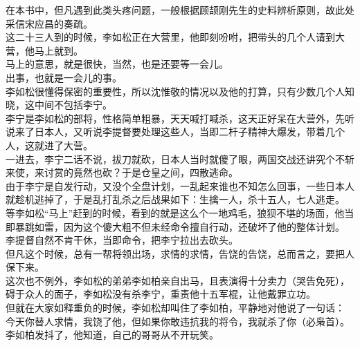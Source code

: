 \begin{multicols}{\theparacolNo}
在本书中，但凡遇到此类头疼问题，一般根据顾颉刚先生的史料辨析原则，故此处采信宋应昌的奏疏。\\

这二十三人到的时候，李如松正在大营里，他即刻吩咐，把带头的几个人请到大营，他马上就到。\\

马上的意思，就是很快，当然，也是还要等一会儿。\\

出事，也就是一会儿的事。\\

李如松很懂得保密的重要性，所以沈惟敬的情况以及他的打算，只有少数几个人知晓，这中间不包括李宁。\\

李宁是李如松的部将，性格简单粗暴，天天喊打喊杀，这天正好呆在大营外，先听说来了日本人，又听说李提督要处理这些人，当即二杆子精神大爆发，带着几个人，这就进了大营。\\

一进去，李宁二话不说，拔刀就砍，日本人当时就傻了眼，两国交战还讲究个不斩来使，来讨赏的竟然也砍？于是仓皇之间，四散逃命。\\

由于李宁是自发行动，又没个全盘计划，一乱起来谁也不知怎么回事，一些日本人就趁机逃掉了，于是乱打乱杀之后战果如下：生擒一人，杀十五人，七人逃走。\\

等李如松“马上”赶到的时候，看到的就是这么个一地鸡毛，狼狈不堪的场面，他当即暴跳如雷，因为这个傻大粗不但未经命令擅自行动，还破坏了他的整体计划。\\

李提督自然不肯干休，当即命令，把李宁拉出去砍头。\\

但凡这个时候，总有一帮将领出场，求情的求情，告饶的告饶，总而言之，要把人保下来。\\

这次也不例外，李如松的弟弟李如柏亲自出马，且表演得十分卖力（哭告免死），碍于众人的面子，李如松没有杀李宁，重责他十五军棍，让他戴罪立功。\\

但就在大家如释重负的时候，李如松却叫住了李如柏，平静地对他说了一句话：\\

今天你替人求情，我饶了他，但如果你敢违抗我的将令，我就杀了你（必枭首）。\\

李如柏发抖了，他知道，自己的哥哥从不开玩笑。\\


\end{multicols}
